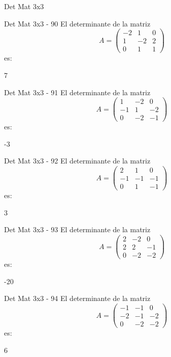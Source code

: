 \documentclass[a4,11pt]{aleph-notas}
\begin{document}
\begin{quiz}{Det Mat 3x3}
\begin{numerical}[tolerance=0]%
    {Det Mat 3x3 - 90}
    El determinante de la matriz
    \[
        A = \begin{pmatrix} -2 & 1 & 0 \\ 1 & -2 & 2 \\ 0 & 1 & 1 \end{pmatrix}
    \]
    es:
    \item[] 7
\end{numerical}

\begin{numerical}[tolerance=0]%
    {Det Mat 3x3 - 91}
    El determinante de la matriz
    \[
        A = \begin{pmatrix} 1 & -2 & 0 \\ -1 & 1 & -2 \\ 0 & -2 & -1 \end{pmatrix}
    \]
    es:
    \item[] -3
\end{numerical}

\begin{numerical}[tolerance=0]%
    {Det Mat 3x3 - 92}
    El determinante de la matriz
    \[
        A = \begin{pmatrix} 2 & 1 & 0 \\ -1 & -1 & -1 \\ 0 & 1 & -1 \end{pmatrix}
    \]
    es:
    \item[] 3
\end{numerical}

\begin{numerical}[tolerance=0]%
    {Det Mat 3x3 - 93}
    El determinante de la matriz
    \[
        A = \begin{pmatrix} 2 & -2 & 0 \\ 2 & 2 & -1 \\ 0 & -2 & -2 \end{pmatrix}
    \]
    es:
    \item[] -20
\end{numerical}

\begin{numerical}[tolerance=0]%
    {Det Mat 3x3 - 94}
    El determinante de la matriz
    \[
        A = \begin{pmatrix} -1 & -1 & 0 \\ -2 & -1 & -2 \\ 0 & -2 & -2 \end{pmatrix}
    \]
    es:
    \item[] 6
\end{numerical}


\end{quiz}
\end{document}
